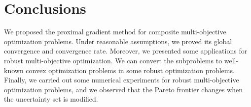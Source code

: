 \documentclass[../main]{subfiles}
\begin{document}
\section{Conclusions} 
We proposed the proximal gradient method for composite multi-objective optimization problems.
Under reasonable assumptions, we proved its global convergence and convergence rate.
Moreover, we presented some applications for robust multi-objective optimization.
We can convert the subproblems to well-known convex optimization problems in some robust optimization problems.
Finally, we carried out some numerical experiments for robust multi-objective optimization problems, and we observed that the Pareto frontier changes when the uncertainty set is modified.
\end{document}
